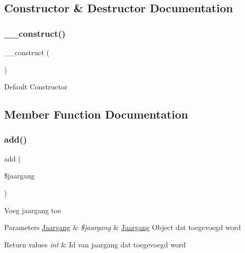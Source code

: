 \subsection{Constructor \& Destructor Documentation}
\mbox{\label{class_jaargang__model_a095c5d389db211932136b53f25f39685}} 
\subsubsection{\texorpdfstring{\+\_\+\+\_\+construct()}{\_\_construct()}}
{\footnotesize\ttfamily \+\_\+\+\_\+construct (\begin{DoxyParamCaption}{ }\end{DoxyParamCaption})}

Default Constructor 

\subsection{Member Function Documentation}
\mbox{\label{class_jaargang__model_a85632de012fc6908d7099ed42afd5fe2}} 
\subsubsection{\texorpdfstring{add()}{add()}}
{\footnotesize\ttfamily add (\begin{DoxyParamCaption}\item[{}]{\$jaargang }\end{DoxyParamCaption})}

Voeg jaargang toe 
\begin{DoxyParams}[1]{Parameters}
\mbox{\hyperlink{class_jaargang}{Jaargang}} & {\em \$jaargang} & \mbox{\hyperlink{class_jaargang}{Jaargang}} Object dat toegevoegd word \\
\hline
\end{DoxyParams}

\begin{DoxyRetVals}{Return values}
{\em int} & Id van jaargang dat toegevoegd word \\
\hline
\end{DoxyRetVals}
\mbox{\label{class_jaargang__model_a696e5350ea9e59a460530ab447486539}} 
